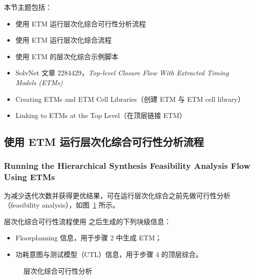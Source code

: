 本节主题包括：
\begin{itemize}
  \item 使用 ETM 运行层次化综合可行性分析流程
  \item 使用 ETM 运行层次化综合流程
  \item 使用 ETM 的层次化综合示例脚本
\end{itemize}

\begin{seeAlsoBox}
\begin{itemize}
  \item SolvNet 文章 2284429，\textit{Top-level Closure Flow With Extracted Timing Models (ETMs)}
  \item Creating ETMs and ETM Cell Libraries（创建 ETM 与 ETM cell library）
  \item Linking to ETMs at the Top Level（在顶层链接 ETM）
\end{itemize}
\end{seeAlsoBox}

\subsection{使用 ETM 运行层次化综合可行性分析流程}
\subsubsection*{Running the Hierarchical Synthesis Feasibility Analysis Flow Using ETMs}

为减少迭代次数并获得更优结果，可在运行层次化综合之前先做可行性分析（feasibility analysis），如图~\ref{fig:hier-etm-feas} 所示。

层次化综合可行性流程使用  之后生成的下列块级信息：
\begin{itemize}
  \item Floorplanning 信息，用于步骤 2 中生成 ETM；
  \item 功耗意图与测试模型（CTL）信息，用于步骤 4 的顶层综合。
\end{itemize}

\begin{figure}[htbp]
\centering
{}
\caption{层次化综合可行性分析}
\label{fig:hier-etm-feas}
\end{figure}

